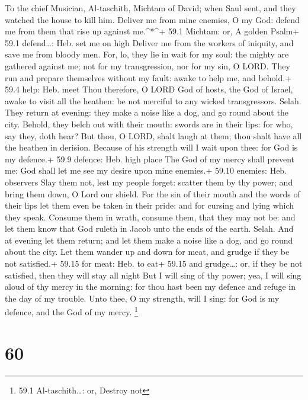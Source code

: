 To the chief Musician, Al-taschith, Michtam of David; when Saul sent,
and they watched the house to kill him.  Deliver me from
mine enemies, O my God: defend me from them that rise up against
me.\^{}*\^{}+ 59.1 Michtam: or, A golden Psalm+ 59.1 defend\ldots: Heb.
set me on high  Deliver me from the workers of iniquity, and
save me from bloody men.  For, lo, they lie in wait for my
soul: the mighty are gathered against me; not for my transgression, nor
for my sin, O LORD.  They run and prepare themselves without
my fault: awake to help me, and behold.+ 59.4 help: Heb. meet
 Thou therefore, O LORD God of hosts, the God of Israel,
awake to visit all the heathen: be not merciful to any wicked
transgressors. Selah.  They return at evening: they make a
noise like a dog, and go round about the city.  Behold, they
belch out with their mouth: swords are in their lips: for who, say they,
doth hear?  But thou, O LORD, shalt laugh at them; thou
shalt have all the heathen in derision.  Because of his
strength will I wait upon thee: for God is my defence.+ 59.9 defence:
Heb. high place  The God of my mercy shall prevent me: God
shall let me see my desire upon mine enemies.+ 59.10 enemies: Heb.
observers  Slay them not, lest my people forget: scatter
them by thy power; and bring them down, O Lord our shield. 
For the sin of their mouth and the words of their lips let them even be
taken in their pride: and for cursing and lying which they speak.
 Consume them in wrath, consume them, that they may not be:
and let them know that God ruleth in Jacob unto the ends of the earth.
Selah.  And at evening let them return; and let them make a
noise like a dog, and go round about the city.  Let them
wander up and down for meat, and grudge if they be not satisfied.+ 59.15
for meat: Heb. to eat+ 59.15 and grudge\ldots: or, if they be not
satisfied, then they will stay all night  But I will sing
of thy power; yea, I will sing aloud of thy mercy in the morning: for
thou hast been my defence and refuge in the day of my trouble.
 Unto thee, O my strength, will I sing: for God is my
defence, and the God of my mercy. \footnote{59.1 Al-taschith\ldots: or,
  Destroy not}

\hypertarget{section-59}{%
\section{60}\label{section-59}}

